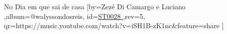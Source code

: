 \beginsong
{No Dia em que sai de casa %
}[by={Zezé Di Camargo e Luciano %
},album={@walyssondosreis},
id={\href{https://music.youtube.com/watch?v=iSH1B-zK1nc&feature=share %
}{ST0028 %
}},rev={5}, %
qr={https://music.youtube.com/watch?v=iSH1B-zK1nc&feature=share %
}]
\beginverse
